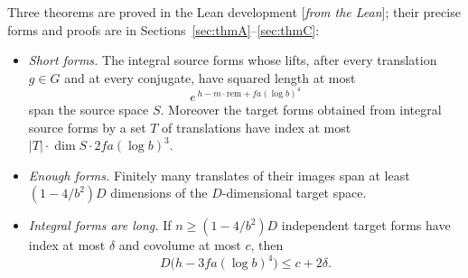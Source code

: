 \documentclass[11pt]{amsart}
\numberwithin{equation}{section}
\theoremstyle{definition}
\theoremstyle{remark}
\newcommand{\status}[1]{\textup{[\emph{#1}]}}
\begin{document}
Three theorems are proved in the Lean development \status{from the Lean}; their precise forms and proofs are in Sections~\ref{sec:thmA}--\ref{sec:thmC}:
\begin{itemize}[leftmargin=2.5em]
\item[(A)] \emph{Short forms.} The integral source forms whose lifts, after every translation $g\in G$ and at every conjugate, have squared length at most
\begin{equation}
 e^{\,h-m\cdot\mathrm{rem}+fa(\log b)^4}
\end{equation}
span the source space $S$. Moreover the target forms obtained from integral source forms by a set $T$ of translations have index at most $|T|\cdot\dim S\cdot2fa(\log b)^3$.
\item[(B)] \emph{Enough forms.} Finitely many translates of their images span at least $(1-4/b^2)D$ dimensions of the $D$-dimensional target space.
\item[(C)] \emph{Integral forms are long.} If $n\ge(1-4/b^2)D$ independent target forms have index at most $\delta$ and covolume at most $c$, then
\begin{equation}
 D\bigl(h-3fa(\log b)^4\bigr)\le c+2\delta.
\end{equation}

\end{itemize}
\end{document}
